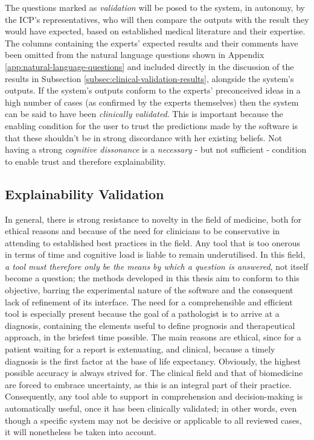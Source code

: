 The questions marked as \textit{validation} will be posed to the system, in autonomy, by the ICP's representatives, who will then compare the outputs with the result they would have expected, based on established medical literature and their expertise.
The columns containing the experts' expected results and their comments have been omitted from the natural language questions shown in Appendix \ref{app:natural-language-questions} and included directly in the discussion of the results in Subsection \ref{subsec:clinical-validation-results}, alongside the system's outputs.
If the system's outputs conform to the experts' preconceived ideas in a high number of cases (as confirmed by the experts themselves) then the system can be said to have been \textit{clinically validated}.
This is important because the enabling condition for the user to trust the predictions made by the software is that these shouldn't be in strong discordance with her existing beliefs.
Not having a strong \textit{cognitive dissonance} is a \textit{necessary} - but not sufficient - condition to enable trust and therefore explainability.

\subsection{Explainability Validation} \label{subsec:explainability-validation}
In general, there is strong resistance to novelty in the field of medicine, both for ethical reasons and because of the need for clinicians to be conservative in attending to established best practices in the field.
Any tool that is too onerous in terms of time and cognitive load is liable to remain underutilised.
In this field, \textit{a tool must therefore only be the means by which a question is answered}, not itself become a question; the methods developed in this thesis aim to conform to this objective, barring the experimental nature of the software and the consequent lack of refinement of its interface.
The need for a comprehensible and efficient tool is especially present because the goal of a pathologist is to arrive at a diagnosis, containing the elements useful to define prognosis and therapeutical approach, in the briefest time possible.
The main reasons are ethical, since for a patient waiting for a report is extenuating, and clinical, because a timely diagnosis is the first factor at the base of life expectancy.
Obviously, the highest possible accuracy is always strived for.
The clinical field and that of biomedicine are forced to embrace uncertainty, as this is an integral part of their practice.
Consequently, any tool able to support in comprehension and decision-making is automatically useful, once it has been clinically validated; in other words, even though a specific system may not be decisive or applicable to all reviewed cases, it will nonetheless be taken into account.

